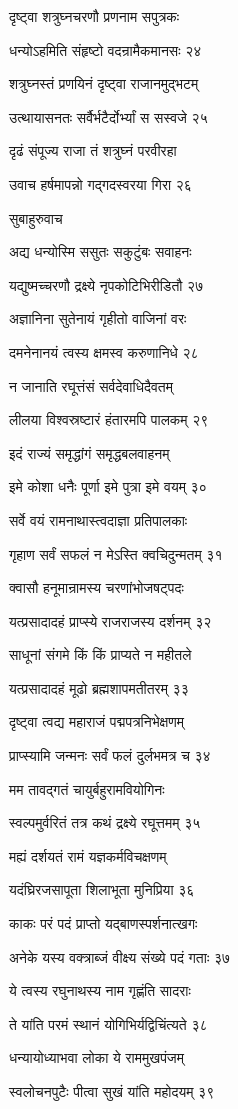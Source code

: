 दृष्ट्वा शत्रुघ्नचरणौ प्रणनाम सपुत्रकः

धन्योऽहमिति संहृष्टो वदन्रामैकमानसः २४

शत्रुघ्नस्तं प्रणयिनं दृष्ट्वा राजानमुद्भटम्

उत्थायासनतः सर्वैर्भटैर्दोर्भ्यां स सस्वजे २५

दृढं संपूज्य राजा तं शत्रुघ्नं परवीरहा

उवाच हर्षमापन्नो गद्गदस्वरया गिरा २६

सुबाहुरुवाच

अद्य धन्योस्मि ससुतः सकुटुंबः सवाहनः

यद्युष्मच्चरणौ द्रक्ष्ये नृपकोटिभिरीडितौ २७

अज्ञानिना सुतेनायं गृहीतो वाजिनां वरः

दमनेनानयं त्वस्य क्षमस्व करुणानिधे २८

न जानाति रघूत्तंसं सर्वदेवाधिदैवतम्

लीलया विश्वस्रष्टारं हंतारमपि पालकम् २९

इदं राज्यं समृद्धांगं समृद्धबलवाहनम्

इमे कोशा धनैः पूर्णा इमे पुत्रा इमे वयम् ३०

सर्वे वयं रामनाथास्त्वदाज्ञा प्रतिपालकाः

गृहाण सर्वं सफलं न मेऽस्ति क्वचिदुन्मतम् ३१

क्वासौ हनूमान्रामस्य चरणांभोजषट्पदः

यत्प्रसादादहं प्राप्स्ये राजराजस्य दर्शनम् ३२

साधूनां संगमे किं किं प्राप्यते न महीतले

यत्प्रसादादहं मूढो ब्रह्मशापमतीतरम् ३३

दृष्ट्वा त्वद्य महाराजं पद्मपत्रनिभेक्षणम्

प्राप्स्यामि जन्मनः सर्वं फलं दुर्लभमत्र च ३४

मम तावद्गतं चायुर्बहुरामवियोगिनः

स्वल्पमुर्वरितं तत्र कथं द्रक्ष्ये रघूत्तमम् ३५

मह्यं दर्शयतं रामं यज्ञकर्मविचक्षणम्

यदंघ्रिरजसापूता शिलाभूता मुनिप्रिया ३६

काकः परं पदं प्राप्तो यद्बाणस्पर्शनात्खगः

अनेके यस्य वक्त्राब्जं वीक्ष्य संख्ये पदं गताः ३७

ये त्वस्य रघुनाथस्य नाम गृह्णंति सादराः

ते यांति परमं स्थानं योगिभिर्यद्विचिंत्यते ३८

धन्यायोध्याभवा लोका ये राममुखपंजम्

स्वलोचनपुटैः पीत्वा सुखं यांति महोदयम् ३९

